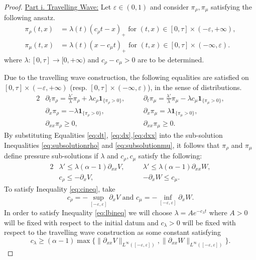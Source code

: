 \documentclass[a4paper,twosided, 11pt]{article}
\newcommand {\e}  {\varepsilon}
\theoremstyle{plain}
\theoremstyle{remark}
\newcommand{\one}{\mathbf{1}}
\numberwithin{equation}{section}
\begin{document}
\begin{proof}
\underline{Part i. Travelling Wave:}
Let $\e \in (0,1)$ and consider $\pi_\rho,\pi_\mu$ satisfying the following ansatz.
\begin{equation}\label{eq:travellingwave}
\begin{split}
\pi_\rho(t,x) & = \lambda(t) (c_\rho t-x)_{+} \text{ for } (t,x) \in [0,\tau] \times (-\e,+\infty), \\
\pi_\mu(t,x) & = \lambda(t) (x- c_\mu t)_{+} \text{ for } (t,x) \in [0,\tau] \times (-\infty,\e).
\end{split}
\end{equation}
where $\lambda\colon [0,\tau] \to [0,+\infty)$ and $c_\rho-c_\mu > 0 $ are to be determined.

\medskip 

Due to the travelling wave construction, the following equalities are satisfied on $[0,\tau] \times (-\e,+\infty)$ (resp. $[0,\tau] \times (-\infty, \e)$), in the sense of distributions.
\begin{alignat}{2}
    &\partial_t \pi_\rho = \frac{\lambda'}{\lambda} \pi_\rho + \lambda c_\rho \one_{\{\pi_\rho > 0 \}}, \quad  &&\partial_t \pi_\mu = \frac{\lambda'}{\lambda} \pi_\mu - \lambda c_\mu\one_{\{\pi_\mu > 0 \}},\label{eq:dt}\\
    &\partial_x \pi_\rho = -\lambda \one_{\{\pi_\rho > 0 \}}, \quad  &&   \partial_x \pi_\mu  = \lambda \one_{\{\pi_\mu > 0 \}},\label{eq:dx}\\
    &\partial_{xx} \pi_\rho \geq 0,  \quad && \partial_{xx}\pi_\mu \geq 0.\label{eq:dxx}
\end{alignat}
By substituting Equalities \eqref{eq:dt}, \eqref{eq:dx},\eqref{eq:dxx} into the sub-solution Inequalities \eqref{eq:subsolutionrho} and \eqref{eq:subsolutionmu}, it follows that $\pi_\rho$ and $\pi_\mu$ define pressure sub-solutions if $\lambda $ and $c_\rho,c_\mu$ satisfy the following:
\begin{alignat}{2}
&\lambda' \leq \lambda (\alpha-1) \partial_{xx} V, \quad &&\lambda' \leq \lambda (\alpha-1) \partial_{xx} W,\label{eq:lbineq}\\
&c_\rho \leq - \partial_x V, \quad &&-\partial_x W \leq c_\mu. \label{eq:cineq}
\end{alignat}
To satisfy Inequality \eqref{eq:cineq}, take 
\begin{equation}\label{eq:constants}
    c_\rho = - \sup_{[-\e,\e]} \partial_x V \text{ and } c_\mu =  - \inf_{[-\e,\e]} \partial_x W.
\end{equation}
In order to satisfy Inequality \eqref{eq:lbineq} we will choose $\lambda  = A e^{-c_{\lambda}t}$ where $A > 0$ will be fixed with respect to the initial datum and $c_\lambda> 0$ will be fixed with respect to the travelling wave construction as some constant satisfying
\begin{equation}\label{eq:clambda}
  c_{\lambda} \ge (\alpha-1) \max\{\|\partial_{xx}V\|_{L^\infty([-\e,\e])},\|\partial_{xx}W\|_{L^\infty([-\e,\e])}\}.  
\end{equation}


\end{proof}
\end{document}
